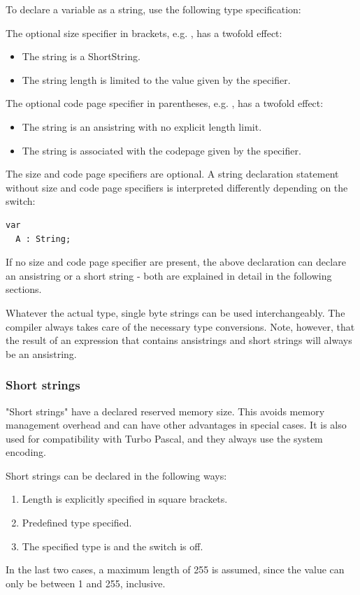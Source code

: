 To declare a variable as a string, use the following type specification:

The optional size specifier in brackets, e.g. , has a twofold effect:
\begin{itemize}
\item The string is a ShortString.
\item The string length is limited to the value given by the specifier.
\end{itemize}

The optional code page specifier in parentheses, e.g. , has a twofold effect:
\begin{itemize}
\item The string is an ansistring with no explicit length limit.
\item The string is associated with the codepage given by the specifier.
\end{itemize}

The size and code page specifiers are optional. A string declaration statement without size and code page specifiers is
interpreted differently depending on the  switch:
\begin{verbatim}
var
  A : String;
\end{verbatim}
If no size and code page specifier are present, the above declaration can declare
an ansistring or a short string - both are explained in detail in the
following sections.

Whatever the actual type, single byte strings can be used interchangeably.
The compiler always takes care of the necessary type conversions.
Note, however, that the result of an expression that contains ansistrings and short strings will always be an ansistring.

\subsubsection{Short strings}
 
"Short strings" have a declared reserved memory size. This avoids memory
management overhead and can have other advantages in special cases.
It is also used for compatibility with Turbo Pascal,
and they always use the system encoding.

Short strings can be declared in the following ways:
\begin{enumerate}
\item Length is explicitly specified in square brackets.
\item Predefined type  specified.
\item The specified type is  and the  switch is off.
\end{enumerate}
In the last two cases, a maximum length of 255 is assumed,
since the value can only be between 1 and 255, inclusive.

